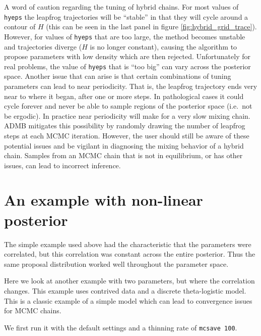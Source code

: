 \documentclass{article}\usepackage[]{graphicx}\usepackage[]{color}
\begin{document}
A word of caution regarding the tuning of hybrid chains. For
most values of \texttt{hyeps} the leapfrog trajectories will
be ``stable'' in that they will cycle around a contour of
$H$ (this can be seen in the last panel in figure
\ref{fig:hybrid_grid_trace}). However, for values of
\texttt{hyeps} that are too large, the method becomes
unstable and trajectories diverge ($H$ is no longer
constant), causing the algorithm to propose parameters with
low density which are then rejected. Unfortunately for real
problems, the value of \texttt{hyeps} that is ``too big''
can vary across the posterior space.  Another issue that can
arise is that certain combinations of tuning parameters can
lead to near periodicity. That is, the leapfrog trajectory
ends very near to where it began, after one or more
steps. In pathological cases it could cycle forever and
never be able to sample regions of the posterior space
(i.e.\ not be ergodic). In practice near periodicity will
make for a very slow mixing chain. ADMB mitigates this
possibility by randomly drawing the number of leapfrog steps
at each MCMC iteration. However, the user should still be
aware of these potential issues and be vigilant in
diagnosing the mixing behavior of a hybrid chain. Samples
from an MCMC chain that is not in equilibrium, or has other
issues, can lead to incorrect inference.

\section{An example with non-linear posterior}
The simple example used above had the characteristic that
the parameters were correlated, but this correlation was
constant across the entire posterior. Thus the same proposal
distribution worked well throughout the parameter space.

Here we look at another example with two parameters, but
where the correlation changes. This example uses contrived
data and a discrete theta-logistic model. This is a classic
example of a simple model which can lead to convergence
issues for MCMC chains.

We first run it with the default settings and a thinning
rate of \texttt{mcsave 100}.
\end{document}
